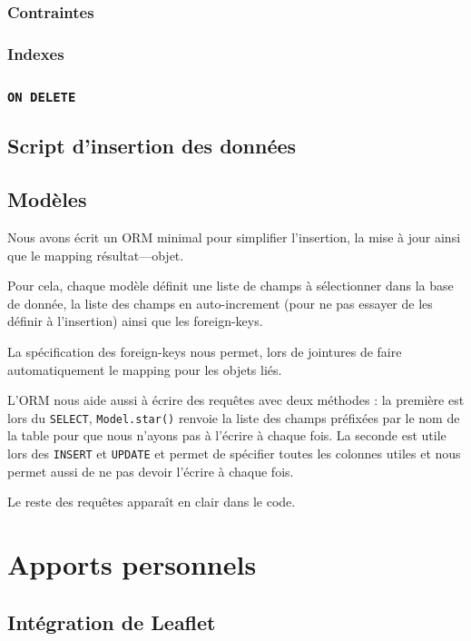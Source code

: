 \documentclass[10pt,a4paper]{article}
\begin{document}
\subsubsection{Contraintes}

\subsubsection{Indexes}

\subsubsection{\texttt{ON DELETE}}

\subsection{Script d'insertion des données}

\subsection{Modèles}

Nous avons écrit un ORM minimal pour simplifier l'insertion, la mise à jour ainsi que le mapping résultat---objet.

Pour cela, chaque modèle définit une liste de champs à sélectionner dans la base de donnée, la liste des champs en auto-increment (pour ne pas essayer de les définir à l'insertion) ainsi que les foreign-keys.

La spécification des foreign-keys nous permet, lors de jointures de faire automatiquement le mapping pour les objets liés.

L'ORM nous aide aussi à écrire des requêtes avec deux méthodes : la première est lors du \texttt{SELECT}, \texttt{Model.star()} renvoie la liste des champs préfixées par le nom de la table pour que nous n'ayons pas à l'écrire à chaque fois. La seconde est utile lors des \texttt{INSERT} et \texttt{UPDATE} et permet de spécifier toutes les colonnes utiles et nous permet aussi de ne pas devoir l'écrire à chaque fois.

Le reste des requêtes apparaît en clair dans le code.

\section{Apports personnels}

\subsection{Intégration de Leaflet}
\end{document}
